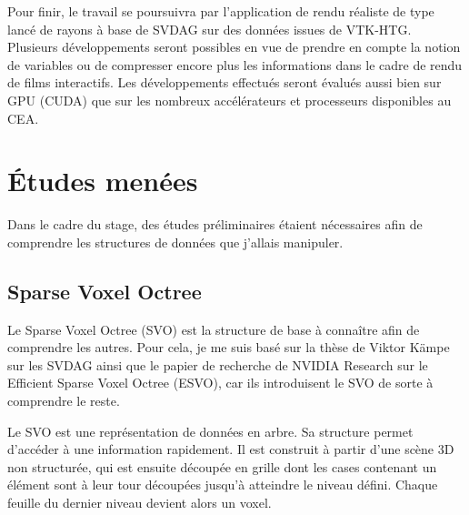 \documentclass[12pt,a4paper,twoside]{article}
\begin{document}
    Pour finir, le travail se poursuivra par l'application de rendu réaliste de type lancé de rayons à base de SVDAG sur
    des données issues de VTK-HTG. Plusieurs développements seront possibles en vue de prendre en compte la notion de variables ou de
    compresser encore plus les informations dans le cadre de rendu de films interactifs. Les développements effectués seront
    évalués aussi bien sur GPU (CUDA) que sur les nombreux accélérateurs et processeurs disponibles au CEA.

    \newpage
    \section{Études menées}     %

    Dans le cadre du stage, des études préliminaires étaient nécessaires afin de comprendre les structures de données que
    j'allais manipuler.

    \subsection{Sparse Voxel Octree}

    Le Sparse Voxel Octree (SVO) est la structure de base à connaître afin de comprendre les autres.
    Pour cela, je me suis basé sur la thèse de Viktor Kämpe sur les SVDAG\cite{kampethesis2016} ainsi que le papier de recherche de NVIDIA
    Research sur le Efficient Sparse Voxel Octree (ESVO)\cite{Laine2010i3d}, car ils introduisent le SVO de sorte à comprendre le reste.

    Le SVO est une représentation de données en arbre. Sa structure permet d'accéder à une information rapidement.
    Il est construit à partir d'une scène 3D non structurée, qui est ensuite découpée en grille dont les cases contenant un élément sont à leur tour découpées jusqu'à atteindre le niveau défini.
    Chaque feuille du dernier niveau devient alors un voxel.

    \begin{figure}[H]
    \end{figure}


    \begin{figure}[H]
    \end{figure}
\end{document}
